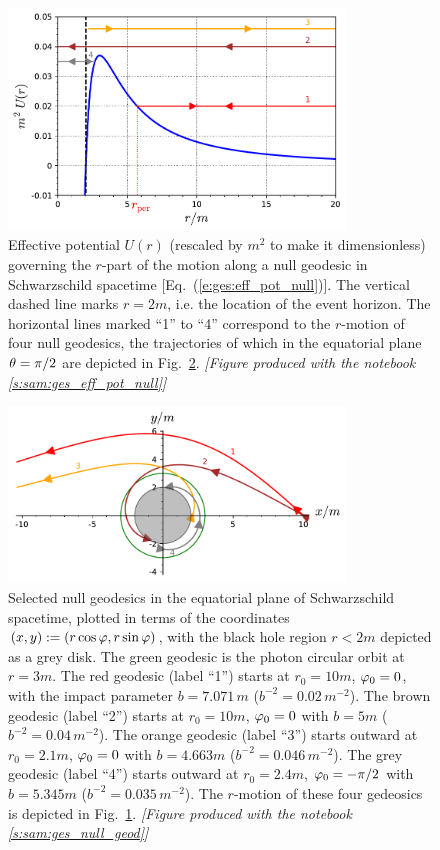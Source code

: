\begin{figure}
\centerline{\includegraphics[width=0.8\textwidth]{ges_eff_pot_null.pdf}}
\caption[]{\label{f:gis:eff_pot_null} \footnotesize
Effective potential $U(r)$ (rescaled by $m^2$ to make it dimensionless)
governing the $r$-part of the
motion along a null geodesic in
Schwarzschild spacetime [Eq.~(\ref{e:ges:eff_pot_null})].
The vertical dashed line marks $r=2m$, i.e. the
location of the event horizon. The horizontal lines marked ``1'' to ``4''
correspond to the $r$-motion of four null geodesics,
the trajectories of which in the equatorial plane $\theta=\pi/2$
are depicted in Fig.~\ref{f:gis:null_geod}.
\textsl{[Figure produced with the notebook \ref{s:sam:ges_eff_pot_null}]}}
\end{figure}

\begin{figure}
\centerline{\includegraphics[width=0.8\textwidth]{ges_null_geod.pdf}}
\caption[]{\label{f:gis:null_geod} \footnotesize
Selected null geodesics in the equatorial plane of Schwarzschild spacetime,
plotted in terms
of the coordinates $(x,y) := (r\cos\varphi, r\sin\varphi)$, with the black hole
region $r<2m$ depicted as a grey disk.
The green geodesic is the photon circular orbit at $r=3m$.
The red geodesic (label ``1'') starts at $r_0=10 m$, $\varphi_0=0$, with
the impact parameter $b = 7.071 \, m$ ($b^{-2} = 0.02\, m^{-2}$).
The brown geodesic (label ``2'') starts at $r_0=10 m$, $\varphi_0=0$ with $b = 5 m$ ($b^{-2} = 0.04\, m^{-2}$).
The orange geodesic (label ``3'') starts outward at $r_0=2.1 m$, $\varphi_0=0$ with $b = 4.663 m$ ($b^{-2} = 0.046\, m^{-2}$).
The grey geodesic (label ``4'') starts outward at $r_0=2.4 m$, $\varphi_0=-\pi/2$ with $b = 5.345 m$ ($b^{-2} = 0.035\, m^{-2}$).
The $r$-motion of these four gedeosics is depicted in
Fig.~\ref{f:gis:eff_pot_null}. \textsl{[Figure produced with the notebook \ref{s:sam:ges_null_geod}]}}
\end{figure}

